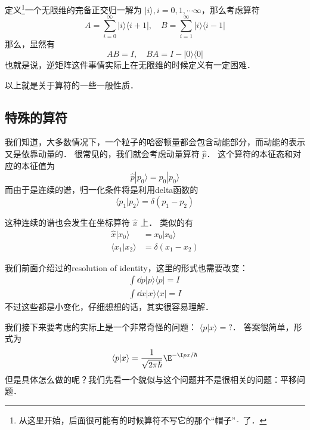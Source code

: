 \begin{example}{}
定义\footnote{从这里开始，后面很可能有的时候算符不写它的那个“帽子” $\hat{\ }$ 了．}一个无限维的完备正交归一解为 $|i\rangle, i = 0, 1, \cdots \infty$，那么考虑算符
\begin{equation}
A =  \sum_{i = 0}^{\infty} |i\rangle\langle i+1|,\quad B = \sum_{i = 1}^{\infty}|i\rangle\langle i-1|
\end{equation}
那么，显然有
\begin{equation}
AB = I,\quad BA = I - |0\rangle\langle0|
\end{equation}
也就是说，逆矩阵这件事情实际上在无限维的时候定义有一定困难．
\end{example}

以上就是关于算符的一些一般性质．

\subsection{特殊的算符}

我们知道，大多数情况下，一个粒子的哈密顿量都会包含动能部分，而动能的表示又是依靠动量的． 很常见的，我们就会考虑动量算符 $\hat p$． 这个算符的本征态和对应的本征值为
\begin{equation}
\hat p|p_0\rangle = p_0 |p_0\rangle
\end{equation}
而由于是连续的谱，归一化条件将是利用delta函数的
\begin{equation}
\langle p_1|p_2\rangle = \delta(p_1-p_2)
\end{equation}

这种连续的谱也会发生在坐标算符 $\hat x$ 上． 类似的有
\begin{align}
\hat x|x_0\rangle &= x_0 |x_0\rangle\\
\langle x_1|x_2\rangle &= \delta(x_1-x_2)
\end{align}

我们前面介绍过的resolution of identity，这里的形式也需要改变：
\begin{gather}
\int \dd{p}|p\rangle\langle p| = I\\
\int \dd{x}|x\rangle\langle x| = I
\end{gather}
不过这些都是小变化，仔细想想的话，其实很容易理解．

我们接下来要考虑的实际上是一个非常奇怪的问题： $\langle p|x\rangle = ?$． 答案很简单，形式为
\begin{equation}
\langle p|x\rangle = \frac{1}{\sqrt{2\pi \hbar}}\E^{-\I px/\hbar}
\end{equation}
但是具体怎么做的呢？我们先看一个貌似与这个问题并不是很相关的问题：平移问题．

